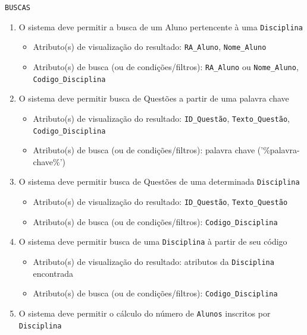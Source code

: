 \documentclass[12pt,a4paper]{article}
\begin{document}
\vspace{0.5cm}
\begin{center}
    \texttt{BUSCAS}
\end{center}
\begin{enumerate}
    \item O sistema deve permitir a busca de um Aluno pertencente à uma \texttt{Disciplina}
        \begin{itemize}
            \item Atributo(s) de visualização do resultado: {\texttt{RA\_Aluno}}, {\texttt{Nome\_Aluno}}
            \item Atributo(s) de busca (ou de condições/filtros): {\texttt{RA\_Aluno}} ou {\texttt{Nome\_Aluno}}, \texttt{Codigo\_Disciplina}
        \end{itemize}
    \item O sistema deve permitir busca de Questões a partir de uma palavra chave
        \begin{itemize}
            \item Atributo(s) de visualização do resultado: \texttt{ID\_Questão}, \texttt{Texto\_Questão}, \texttt{Codigo\_Disciplina}
            \item Atributo(s) de busca (ou de condições/filtros): palavra chave ('\%palavra-chave\%')
        \end{itemize}
    \item O sistema deve permitir busca de Questões de uma determinada \texttt{Disciplina}
        \begin{itemize}
            \item Atributo(s) de visualização do resultado: \texttt{ID\_Questão}, \texttt{Texto\_Questão}
            \item Atributo(s) de busca (ou de condições/filtros): \texttt{Codigo\_Disciplina}
        \end{itemize}
    \item O sistema deve permitir busca de uma \texttt{Disciplina} à partir de seu código 
        \begin{itemize}
            \item Atributo(s) de visualização do resultado: atributos da \texttt{Disciplina} encontrada
            \item Atributo(s) de busca (ou de condições/filtros): \texttt{Codigo\_Disciplina}
        \end{itemize}
    \item O sistema deve permitir o cálculo do número de \texttt{Alunos} inscritos por \texttt{Disciplina}

\end{enumerate}
\end{document}

